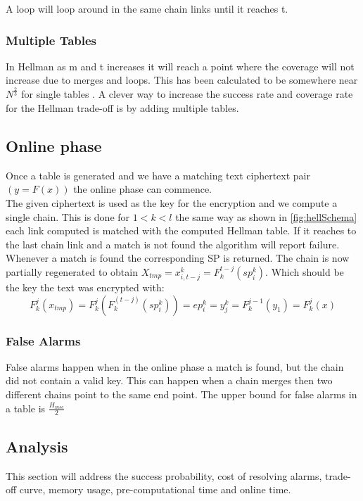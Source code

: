 A loop will loop around in the same chain links until it reaches t.

\subsubsection{Multiple Tables}
In Hellman as m and t increases it will reach a point where the coverage will not increase due to merges and loops. This has been calculated to be somewhere near $N^{\frac{2}{3}}$ for single tables \cite{176}. A clever way to increase the success rate and coverage rate for the Hellman trade-off is by adding multiple tables.

\subsection{Online phase}
Once a table is generated and we have a matching text ciphertext pair $(y=F(x))$ the online phase can commence.\\
The given ciphertext is used as the key for the encryption and we compute a single chain. This is done for $1<k<l$ the same way as shown in \ref{fig:hellSchema} each link computed is matched with the computed Hellman table. If it reaches to the last chain link and a match is not found the algorithm will report failure.\\

Whenever a match is found the corresponding SP is returned. The chain is now partially regenerated to obtain $X_{tmp}=x^k_{i,t-j}=F^{t-j}_k(sp^k_i)$. Which should be the key the text was encrypted with:
\begin{equation}
    F^j_k(x_{tmp})=F^j_k(F^(t-j)_k(sp^k_i))=ep^k_i=y^k_j=F^{j-1}_k(y_1)=F^j_k(x)
\end{equation}
\subsubsection{False Alarms}

False alarms happen when in the online phase a match is found, but the
chain did not contain a valid key. This can happen when a chain merges
then two different chains point to the same end point.
The upper bound for false alarms in a table is $\frac{H_{msc}}{2}$


\subsection{Analysis}
This section will address the success probability, cost of resolving alarms, trade-off curve, memory usage, pre-computational time and online time.

